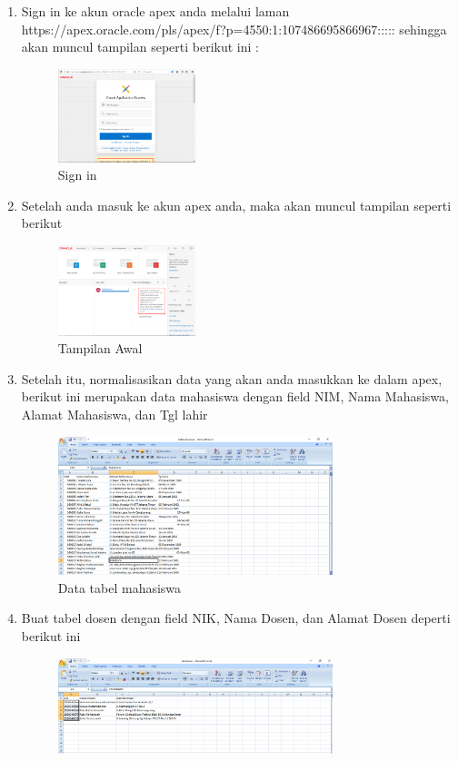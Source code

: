 \begin{enumerate}
	\item Sign in ke akun oracle apex anda melalui laman https://apex.oracle.com/pls/apex/f?p=4550:1:107486695866967::::: sehingga akan muncul tampilan seperti berikut ini :
		\begin{figure}[H]
		\includegraphics[width=4cm]{figures/signin.png}
		\centering
		\caption{Sign in}
		\end{figure}
	\item Setelah anda masuk ke akun apex anda, maka akan muncul tampilan seperti berikut
		\begin{figure}[H]
		\includegraphics[width=4cm]{figures/2.png}
		\centering
		\caption{Tampilan Awal}
		\end{figure}
	\item Setelah itu, normalisasikan data yang akan anda masukkan ke dalam apex, berikut ini merupakan data mahasiswa dengan field NIM, Nama Mahasiswa, Alamat Mahasiswa, dan Tgl lahir 
				\begin{figure}[H]
				\includegraphics[width=8cm]{figures/tabelmahasiswa.PNG}
				\centering
				\caption{Data tabel mahasiswa}
				\end{figure}
	\item Buat tabel dosen dengan field NIK, Nama Dosen, dan Alamat Dosen deperti berikut ini
	            \begin{figure}[H]
				\includegraphics[width=8cm]{figures/tabeldosen.PNG}

\end{figure}
\end{enumerate}
